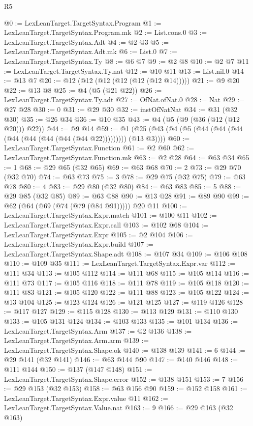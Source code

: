 \begin{lexlean}{R5}
\begin{coremodule}
@0 := LexLeanTarget.TargetSyntax.Program
@1 := LexLeanTarget.TargetSyntax.Program.mk
@2 := List.cons.{0}
@3 := LexLeanTarget.TargetSyntax.Adt
@4 := @2 @3
@5 := LexLeanTarget.TargetSyntax.Adt.mk
@6 := List.{0}
@7 := LexLeanTarget.TargetSyntax.Ty
@8 := @6 @7
@9 := @2 @8
@10 := @2 @7
@11 := LexLeanTarget.TargetSyntax.Ty.nat
@12 := @10 @11
@13 := List.nil.{0}
@14 := @13 @7
@20 := @12 (@12 (@12 (@12 (@12 (@12 @14)))))
@21 := @9 @20
@22 := @13 @8
@25 := @4 (@5 (@21 @22))
@26 := LexLeanTarget.TargetSyntax.Ty.adt
@27 := OfNat.ofNat.{0}
@28 := Nat
@29 := @27 @28
@30 := 0
@31 := @29 @30
@32 := instOfNatNat
@34 := @31 (@32 @30)
@35 := @26 @34
@36 := @10 @35
@43 := @4 (@5 (@9 (@36 (@12 (@12 @20))) @22))
@44 := @9 @14
@59 := @1 (@25 (@43 (@4 (@5 (@44 (@44 (@44 (@44 (@44 (@44 (@44 (@44 @22))))))))) (@13 @3))))
@60 := LexLeanTarget.TargetSyntax.Function
@61 := @2 @60
@62 := LexLeanTarget.TargetSyntax.Function.mk
@63 := @2 @28
@64 := @63 @34
@65 := 1
@68 := @29 @65 (@32 @65)
@69 := @63 @68
@70 := 2
@73 := @29 @70 (@32 @70)
@74 := @63 @73
@75 := 3
@78 := @29 @75 (@32 @75)
@79 := @63 @78
@80 := 4
@83 := @29 @80 (@32 @80)
@84 := @63 @83
@85 := 5
@88 := @29 @85 (@32 @85)
@89 := @63 @88
@90 := @13 @28
@91 := @89 @90
@99 := @62 (@64 (@69 (@74 (@79 (@84 @91))))) @20 @11
@100 := LexLeanTarget.TargetSyntax.Expr.match
@101 := @100 @11
@102 := LexLeanTarget.TargetSyntax.Expr.call
@103 := @102 @68
@104 := LexLeanTarget.TargetSyntax.Expr
@105 := @2 @104
@106 := LexLeanTarget.TargetSyntax.Expr.build
@107 := LexLeanTarget.TargetSyntax.Shape.adt
@108 := @107 @34
@109 := @106 @108
@110 := @109 @35
@111 := LexLeanTarget.TargetSyntax.Expr.var
@112 := @111 @34
@113 := @105 @112
@114 := @111 @68
@115 := @105 @114
@116 := @111 @73
@117 := @105 @116
@118 := @111 @78
@119 := @105 @118
@120 := @111 @83
@121 := @105 @120
@122 := @111 @88
@123 := @105 @122
@124 := @13 @104
@125 := @123 @124
@126 := @121 @125
@127 := @119 @126
@128 := @117 @127
@129 := @115 @128
@130 := @113 @129
@131 := @110 @130
@133 := @105 @131 @124
@134 := @103 @133
@135 := @101 @134
@136 := LexLeanTarget.TargetSyntax.Arm
@137 := @2 @136
@138 := LexLeanTarget.TargetSyntax.Arm.arm
@139 := LexLeanTarget.TargetSyntax.Shape.ok
@140 := @138 @139
@141 := 6
@144 := @29 @141 (@32 @141)
@146 := @63 @144 @90
@147 := @140 @146
@148 := @111 @144
@150 := @137 (@147 @148)
@151 := LexLeanTarget.TargetSyntax.Shape.error
@152 := @138 @151
@153 := 7
@156 := @29 @153 (@32 @153)
@158 := @63 @156 @90
@159 := @152 @158
@161 := LexLeanTarget.TargetSyntax.Expr.value @11
@162 := LexLeanTarget.TargetSyntax.Value.nat
@163 := 9
@166 := @29 @163 (@32 @163)

\end{coremodule}
\end{lexlean}
